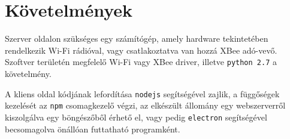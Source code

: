 \section{Követelmények}

Szerver oldalon szükséges egy számítógép, amely hardware tekintetében
rendelkezik Wi-Fi rádióval, vagy csatlakoztatva van hozzá XBee adó-vevő.
Szoftver területén megfelelő Wi-Fi vagy XBee driver, illetve \verb|python 2.7| a
követelmény.

A kliens oldal kódjának lefordítása \verb|nodejs| segítségével zajlik, a
függőségek kezelését az \verb|npm| csomagkezelő végzi, az elkészült állomány egy
webszerverről kiszolgálva egy böngészőből érhető el, vagy pedig \verb|electron|
segítségével becsomagolva önállóan futtatható programként.
